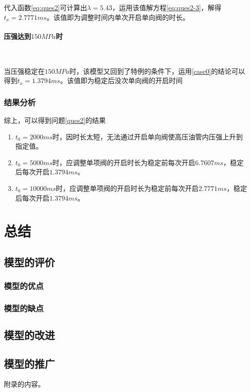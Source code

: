 \documentclass{cumcmthesis}
\begin{document}
代入函数\cref{eq:ques2}可计算出$\lambda=5.43$，运用该值解方程\cref{eq:ques2-3}，解得$t_{x} = 2.7771ms$。该值即为调整时间内单次开启单向阀的时长。

\paragraph{压强达到$150MPa$时}~{}

当压强稳定在$150MPa$时，该模型又回到了特例的条件下，运用\ref{case0}的结论可以得到$t_{x} = 1.3794ms$。该值即为稳定后没次单向阀的开启时间

\subsubsection{结果分析}
综上，可以得到问题\ref{ques2}的结果
\begin{enumerate}
	\item $t_{0}=2000ms$时，因时长太短，无法通过开启单向阀使高压油管内压强上升到指定值。
	\item $t_{0}=5000ms$时，应调整单项阀的开启时长为稳定前每次开启$6.7607ms$，稳定后每次开启$1.3794ms$。
	\item$t_{0}=10000ms$时，应调整单项阀的开启时长为稳定前每次开启$2.7771ms$，稳定后每次开启$1.3794ms$。
\end{enumerate}
\section{总结}
\subsection{模型的评价}
\subsubsection{模型的优点}
\subsubsection{模型的缺点}
\subsection{模型的改进}
\subsection{模型的推广}

\begin{thebibliography}{9}%
\end{thebibliography}

\begin{appendices}
	附录的内容。
\end{appendices}
\end{document}
